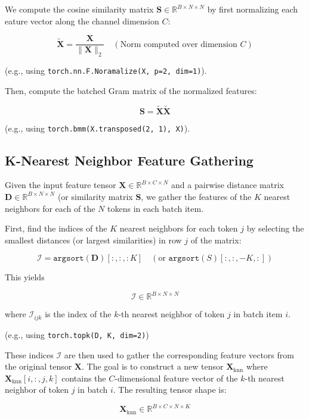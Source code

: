 \documentclass{article}
\begin{document}
We compute the cosine similarity matrix \(\mathbf{S} \in \mathbb{R}^{B \times N \times N}\) by first normalizing each eature vector along the channel dimension \(C\): 

\[
    \tilde{\mathbf{X}} = \frac{\mathbf{X}}{\|\mathbf{X}\|_2} \quad (\text{Norm computed over dimension } C)
\]

(e.g., using \texttt{torch.nn.F.Noramalize(X, p=2, dim=1)}).

Then, compute the batched Gram matrix of the normalized features: 

\[
\mathbf{S} = \tilde{\mathbf{X}}\tilde{\mathbf{X}}
\]

(e.g., using \texttt{torch.bmm(X.transposed(2, 1), X)}).

\subsection{K-Nearest Neighbor Feature Gathering}

Given the input feature tensor \(\mathbf{X} \in \mathbb{R}^{B \times C \times N}\) and a pairwise distance matrix \(\mathbf{D} \in \mathbb{R}^{B \times N \times N}\) (or similarity matrix \(\mathbf{S}\), we gather the features of the \(K\) nearest neighbors for each of the \(N\) tokens in each batch item. 

First, find the indices of the \(K\) nearest neighbors for each token \(j\) by selecting the smallest distances (or largest similarities) in row \(j\) of the matrix: 

\[
    \mathcal{I} = \texttt{argsort}(\mathbf{D})[:, :, :K] \quad (\text{or } \texttt{argsort}(S)[:, :, -K, :])
\]

This yields

\[
    \mathcal{I} \in \mathbb{R}^{B \times N \times N}
\]

where \(\mathcal{I}_{ijk}\) is the index of the \(k\)-th nearest neighbor of token \(j\) in batch item \(i\).

(e.g., using \texttt{torch.topk(D, K, dim=2)})

These indices \(\mathcal{I}\) are then used to gather the corresponding feature vectors from the original tensor \(\mathbf{X}\). The goal is to construct a new tensor \(\mathbf{X}_{\text{knn}}\) where \(\mathbf{X}_{\text{knn}}[i, :, j, k]\) contains the \(C\)-dimensional feature vector of the \(k\)-th nearest neighbor of token \(j\) in batch \(i\). The resulting tensor shape is: 

\[
    \mathbf{X}_{\text{knn}} \in \mathbb{R}^{B \times C \times N \times K}
\]
\end{document}

